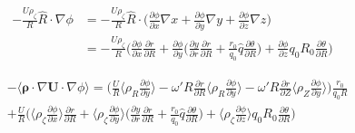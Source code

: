 \documentclass[12pt]{article}
\begin{document}
\begin{CJK*}{UTF8}{gbsn}
\begin{equation}
    \begin{split}
        -\frac{U\rho_\zeta}{R}\hat{R}\cdot\nabla\phi &= -\frac{U\rho_\zeta}{R}\hat{R}\cdot\bigg(\frac{\partial\phi}{\partial x}\nabla x
        + \frac{\partial\phi}{\partial y}\nabla y + \frac{\partial\phi}{\partial z}\nabla z\bigg)\\
        &=-\frac{U\rho_\zeta}{R}\bigg(\frac{\partial\phi}{\partial x}\frac{\partial r}{\partial R} 
        + \frac{\partial\phi}{\partial y}\bigg(\frac{\partial y}{\partial r}\frac{\partial r}{\partial R}
        + \frac{r_0}{q_0}\hat{q}\frac{\partial \theta}{\partial R}\bigg)
        + \frac{\partial \phi}{\partial z}q_0R_0\frac{\partial \theta}{\partial R}\bigg)
    \end{split}
\end{equation}

\begin{equation}
    \begin{split}
        &-\langle\boldsymbol{\rho}\cdot\nabla \mathbf{U}\cdot\nabla\phi\rangle=
        \bigg(\frac{U}{R}\bigg\langle\rho_R\frac{\partial\phi}{\partial y}\bigg\rangle -\omega'R\frac{\partial r}{\partial R}\bigg\langle\rho_R\frac{\partial\phi}{\partial y}\bigg\rangle -\omega'R\frac{\partial r}{\partial Z}\bigg\langle\rho_Z\frac{\partial\phi}{\partial y}\bigg\rangle)\frac{r_0}{q_0R}\\
        &+\frac{U}{R}\bigg(\bigg\langle\rho_\zeta\frac{\partial\phi}{\partial x}\bigg\rangle\frac{\partial r}{\partial R} 
        + \bigg\langle\rho_\zeta\frac{\partial\phi}{\partial y}\bigg\rangle\bigg(\frac{\partial y}{\partial r}\frac{\partial r}{\partial R}
        + \frac{r_0}{q_0}\hat{q}\frac{\partial \theta}{\partial R}\bigg)
        + \bigg\langle\rho_\zeta\frac{\partial \phi}{\partial z}\bigg\rangle q_0R_0\frac{\partial \theta}{\partial R}\bigg)
    \end{split}
\end{equation}


\end{CJK*}
\end{document}
